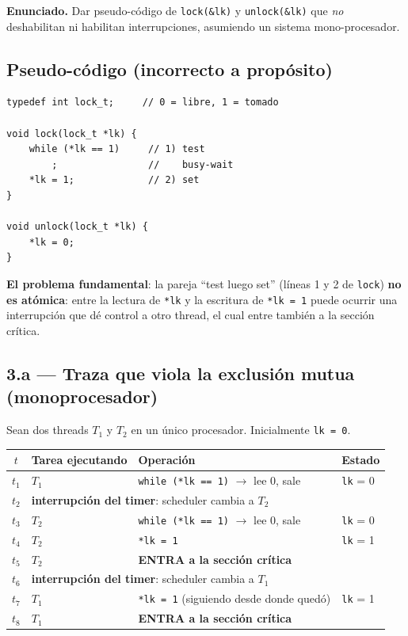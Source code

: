 \documentclass[11pt,a4paper]{article}
\begin{document}
\textbf{Enunciado.} Dar pseudo-código de \texttt{lock(\&lk)} y
\texttt{unlock(\&lk)} que \emph{no} deshabilitan ni habilitan
interrupciones, asumiendo un sistema mono-procesador.

\subsection*{Pseudo-código (incorrecto a propósito)}

\begin{lstlisting}[style=cstyle]
typedef int lock_t;     // 0 = libre, 1 = tomado

void lock(lock_t *lk) {
    while (*lk == 1)     // 1) test
        ;                //    busy-wait
    *lk = 1;             // 2) set
}

void unlock(lock_t *lk) {
    *lk = 0;
}
\end{lstlisting}

\textbf{El problema fundamental}: la pareja ``test luego set''
(líneas 1 y 2 de \texttt{lock}) \textbf{no es atómica}: entre la
lectura de \texttt{*lk} y la escritura de \texttt{*lk = 1} puede
ocurrir una interrupción que dé control a otro thread, el cual entre
también a la sección crítica.

\subsection*{3.a --- Traza que viola la exclusión mutua (monoprocesador)}

Sean dos threads $T_1$ y $T_2$ en un único procesador. Inicialmente
\texttt{lk = 0}.

\begin{center}
\small
\begin{tabular}{@{}clp{6cm}p{3.5cm}@{}}
\toprule
$t$ & Tarea ejecutando & Operación & Estado \\
\midrule
$t_1$ & $T_1$ & \texttt{while (*lk == 1)} $\to$ lee $0$, sale & \texttt{lk} = 0 \\
$t_2$ & \multicolumn{2}{l}{\textbf{interrupción del timer}: scheduler cambia a $T_2$} & \\
$t_3$ & $T_2$ & \texttt{while (*lk == 1)} $\to$ lee $0$, sale & \texttt{lk} = 0 \\
$t_4$ & $T_2$ & \texttt{*lk = 1} & \texttt{lk} = 1 \\
$t_5$ & $T_2$ & \textbf{ENTRA a la sección crítica} & \\
$t_6$ & \multicolumn{2}{l}{\textbf{interrupción del timer}: scheduler cambia a $T_1$} & \\
$t_7$ & $T_1$ & \texttt{*lk = 1} (siguiendo desde donde quedó) & \texttt{lk} = 1 \\
$t_8$ & $T_1$ & \textbf{ENTRA a la sección crítica} & \\
\bottomrule
\end{tabular}
\end{center}
\end{document}
